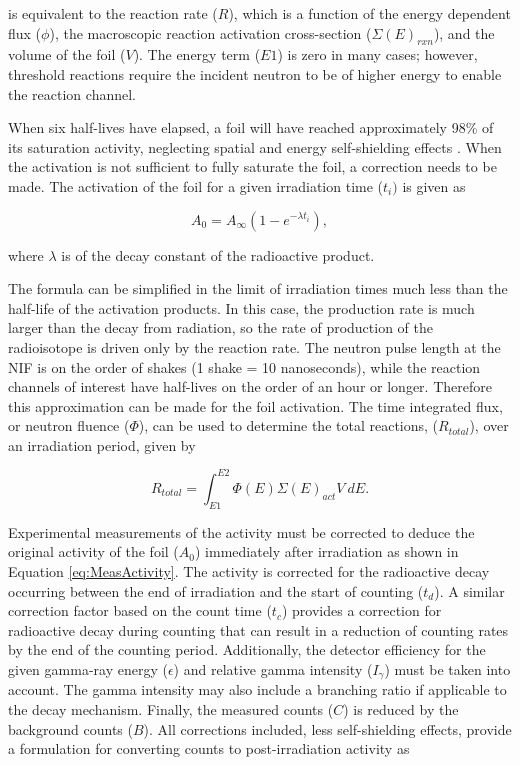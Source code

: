 \noindent is equivalent to the reaction rate ($R$), which is a function of the energy dependent flux ($\phi$), the macroscopic reaction activation cross-section ($\Sigma(E)_{rxn}$), and the volume of  the foil ($V$). The energy term ($E1$) is zero in many cases; however, threshold reactions require the incident neutron to be of higher energy to enable the reaction channel. 

When six half-lives have elapsed, a foil will have reached approximately 98\% of its saturation activity, neglecting spatial and energy self-shielding effects \cite{Knoll}. 
When the activation is not sufficient to fully saturate the foil, a correction needs to be made.
The activation of the foil for a given irradiation time ($t_{i})$ is given as 

\begin{equation} \label{eq:ReactionRate}
A_{0} = A_{\infty}(1-e^{-\lambda t_{i}}), 
\end{equation}

\noindent where $\lambda$ is of the decay constant of the radioactive product.

The formula can be simplified in the limit of irradiation times much less than 
the half-life of the activation products. In this case, the production rate is 
much larger than the decay from radiation, so the rate of production of the 
radioisotope is driven only by the reaction rate. The neutron pulse length at the NIF is on the order of shakes (1 shake = 10 nanoseconds), while the reaction channels of interest have half-lives on the order of an hour or longer. Therefore this approximation can be made for the foil activation. The time integrated flux, or neutron fluence ($\Phi$), can be used to determine the total reactions, ($R_{total}$),
over an irradiation period, given by

\begin{equation} \label{eq:NIFrxnRate}
R_{total} = \int_{E1}^{E2} \Phi(E) \Sigma(E) _{act} V \:dE.
\end{equation}

Experimental measurements of the activity must be corrected to deduce the original activity of the foil ($A_{0}$) immediately after irradiation as shown in Equation \ref{eq:MeasActivity}. 
The activity is corrected for the radioactive decay occurring between the end of irradiation and the start of counting ($t_{d}$). 
A similar correction factor based on the count time ($t_{c}$) provides a correction for radioactive decay during counting that can result in a reduction of counting rates by the end of the counting period. 
Additionally, the detector efficiency for the given gamma-ray energy ($\epsilon$) and relative gamma intensity ($I_{\gamma}$) must be taken into account. 
The gamma intensity may also include a branching ratio if applicable to the decay mechanism.
Finally, the measured counts ($C$) is reduced by the background counts ($B$). 
All corrections included, less self-shielding effects, provide a formulation for converting counts to post-irradiation activity as  

